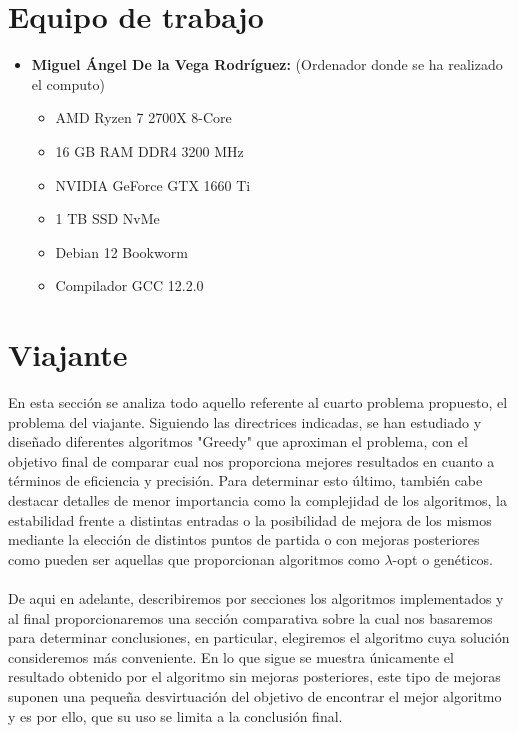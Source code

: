 \documentclass[11pt,openany]{book}
\begin{document}
\chapter{Equipo de trabajo}

\begin{itemize}
      \item \textbf{Miguel Ángel De la Vega Rodríguez:} (Ordenador donde se ha realizado el computo)
            \begin{itemize}
                  \item AMD Ryzen 7 2700X 8-Core
                  \item 16 GB RAM DDR4 3200 MHz
                  \item NVIDIA GeForce GTX 1660 Ti
                  \item 1 TB SSD NvMe
                  \item Debian 12 Bookworm
                  \item Compilador GCC 12.2.0
            \end{itemize}
\end{itemize}
\chapter{Viajante} %
En esta sección se analiza todo aquello referente al cuarto problema propuesto,
el problema del viajante. Siguiendo las directrices indicadas, se han estudiado
y diseñado diferentes algoritmos "Greedy" que aproximan el problema, con el objetivo
final de comparar cual nos proporciona mejores resultados en cuanto a términos
de eficiencia y precisión. Para determinar esto último, también cabe destacar
detalles de menor importancia como la complejidad de los algoritmos, la estabilidad
frente a distintas entradas o la posibilidad de mejora de los mismos mediante la
elección de distintos puntos de partida o con mejoras posteriores como pueden ser 
aquellas que proporcionan algoritmos como $\lambda$-opt o genéticos.
\\ \\
De aqui en adelante, describiremos por secciones los algoritmos implementados y 
al final proporcionaremos una sección comparativa sobre la cual nos basaremos
para determinar conclusiones, en particular, elegiremos el algoritmo cuya
solución consideremos más conveniente. En lo que sigue se muestra únicamente
el resultado obtenido por el algoritmo sin mejoras posteriores, este tipo de mejoras
suponen una pequeña desvirtuación del objetivo de encontrar el mejor algoritmo y 
es por ello, que su uso se limita a la conclusión final.
\end{document}
